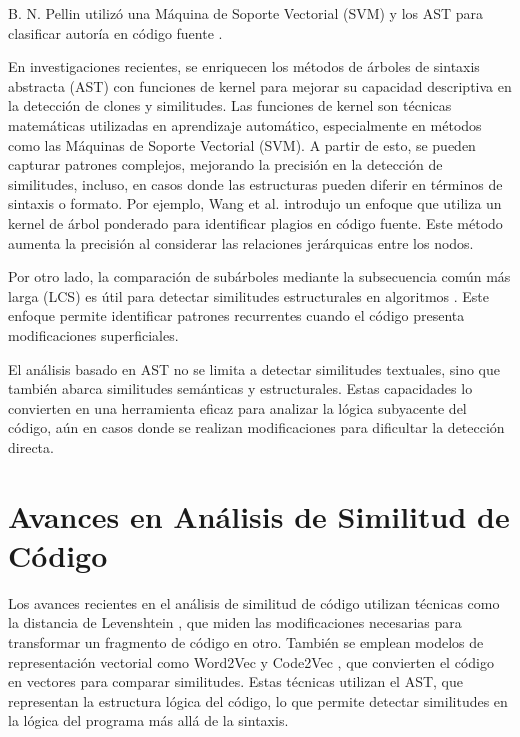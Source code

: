 B. N. Pellin utilizó una M\'aquina de Soporte Vectorial (SVM) y los AST para clasificar autoría en código fuente \cite{pellin2004authorship}.

En investigaciones recientes, se enriquecen los métodos de árboles de sintaxis abstracta (AST) con funciones de kernel para mejorar su capacidad descriptiva en la detección de clones y similitudes. Las funciones de kernel son técnicas matemáticas utilizadas en aprendizaje automático, especialmente en métodos como las Máquinas de Soporte Vectorial (SVM). A partir de esto, se pueden capturar patrones complejos, mejorando la precisión en la detección de similitudes, incluso, en casos donde las estructuras pueden diferir en términos de sintaxis o formato. Por ejemplo, Wang et al. \cite{wang2022kernel} introdujo un enfoque que utiliza un kernel de árbol ponderado para identificar plagios en código fuente. Este método aumenta la precisión al considerar las relaciones jerárquicas entre los nodos.

Por otro lado, la comparación de subárboles mediante la subsecuencia común más larga (LCS) es útil para detectar similitudes estructurales en algoritmos \cite{smith2020subtree}. Este enfoque permite identificar patrones recurrentes cuando el código presenta modificaciones superficiales.

El análisis basado en AST no se limita a detectar similitudes textuales, sino que también abarca similitudes semánticas y estructurales. Estas capacidades lo convierten en una herramienta eficaz para analizar la lógica subyacente del código, aún en casos donde se realizan modificaciones para dificultar la detección directa.


\section{Avances en Análisis de Similitud de Código}

Los avances recientes en el análisis de similitud de código utilizan técnicas como la distancia de Levenshtein \cite{levenshteinCloneDetection}, que miden las modificaciones necesarias para transformar un fragmento de código en otro. También se emplean modelos de representación vectorial como Word2Vec y Code2Vec \cite{alon2019code2vec}, que convierten el código en vectores para comparar similitudes. Estas técnicas utilizan el AST, que representan la estructura lógica del código, lo que permite detectar similitudes en la lógica del programa más allá de la sintaxis.

